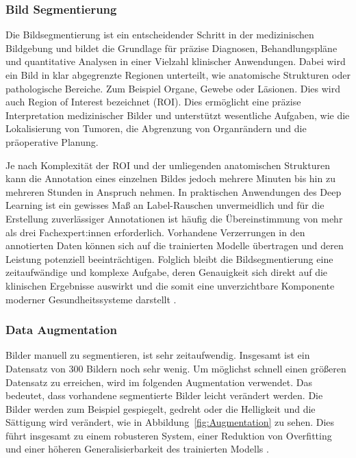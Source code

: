 \documentclass[
	german,
	accentcolor=10c,%
	type=intern,
	marginpar=false
	]{tudapub}
\begin{document}
\subsubsection{Bild Segmentierung}

Die Bildsegmentierung ist ein entscheidender Schritt in der medizinischen Bildgebung und bildet die Grundlage für präzise Diagnosen, Behandlungspläne und quantitative Analysen in einer Vielzahl klinischer Anwendungen. Dabei wird ein Bild in klar abgegrenzte Regionen unterteilt, wie anatomische Strukturen oder pathologische Bereiche. Zum Beispiel Organe, Gewebe oder Läsionen. Dies wird auch Region of Interest bezeichnet (ROI). Dies ermöglicht eine präzise Interpretation medizinischer Bilder und unterstützt wesentliche Aufgaben, wie die Lokalisierung von Tumoren, die Abgrenzung von Organrändern und die präoperative Planung.

Je nach Komplexität der ROI und der umliegenden anatomischen Strukturen kann die Annotation eines einzelnen Bildes jedoch mehrere Minuten bis hin zu mehreren Stunden in Anspruch nehmen. In praktischen Anwendungen des Deep Learning ist ein gewisses Maß an Label-Rauschen unvermeidlich und für die Erstellung zuverlässiger Annotationen ist häufig die Übereinstimmung von mehr als drei Fachexpert:innen erforderlich. Vorhandene Verzerrungen in den annotierten Daten können sich auf die trainierten Modelle übertragen und deren Leistung potenziell beeinträchtigen. Folglich bleibt die Bildsegmentierung eine zeitaufwändige und komplexe Aufgabe, deren Genauigkeit sich direkt auf die klinischen Ergebnisse auswirkt und die somit eine unverzichtbare Komponente moderner Gesundheitssysteme darstellt \cite{ref10}.

\subsubsection{Data Augmentation}
Bilder manuell zu segmentieren, ist sehr zeitaufwendig. Insgesamt ist ein Datensatz von 300 Bildern noch sehr wenig. Um möglichst schnell einen größeren Datensatz zu erreichen, wird im folgenden Augmentation verwendet. Das bedeutet, dass vorhandene segmentierte Bilder leicht verändert werden. Die Bilder werden zum Beispiel gespiegelt, gedreht oder die Helligkeit und die Sättigung wird verändert, wie in Abbildung~\ref{fig:Augmentation} zu sehen. Dies führt insgesamt zu einem robusteren System, einer Reduktion von Overfitting und einer höheren Generalisierbarkeit des trainierten Modells \cite{Augmentation}.
\end{document}
